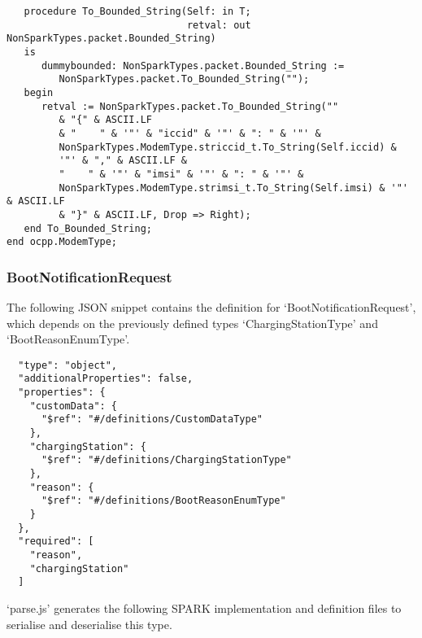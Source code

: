 \documentclass[12pt,openany,a4paper]{book}
\begin{document}
\begin{verbatim}
   procedure To_Bounded_String(Self: in T;
                               retval: out NonSparkTypes.packet.Bounded_String)
   is
      dummybounded: NonSparkTypes.packet.Bounded_String := 
         NonSparkTypes.packet.To_Bounded_String(""); 
   begin
      retval := NonSparkTypes.packet.To_Bounded_String(""
         & "{" & ASCII.LF
         & "    " & '"' & "iccid" & '"' & ": " & '"' & 
         NonSparkTypes.ModemType.striccid_t.To_String(Self.iccid) & 
         '"' & "," & ASCII.LF & 
         "    " & '"' & "imsi" & '"' & ": " & '"' & 
         NonSparkTypes.ModemType.strimsi_t.To_String(Self.imsi) & '"' & ASCII.LF
         & "}" & ASCII.LF, Drop => Right);
   end To_Bounded_String;
end ocpp.ModemType;

\end{verbatim}




















\subsubsection{BootNotificationRequest}
The following JSON snippet contains the definition for `BootNotificationRequest', which depends on the previously defined types `ChargingStationType' and `BootReasonEnumType'.

\begin{verbatim}
  "type": "object",
  "additionalProperties": false,
  "properties": {
    "customData": {
      "$ref": "#/definitions/CustomDataType"
    },
    "chargingStation": {
      "$ref": "#/definitions/ChargingStationType"
    },
    "reason": {
      "$ref": "#/definitions/BootReasonEnumType"
    }
  },
  "required": [
    "reason",
    "chargingStation"
  ]
\end{verbatim}

`parse.js' generates the following SPARK implementation and definition files to serialise and deserialise this type.
\end{document}

